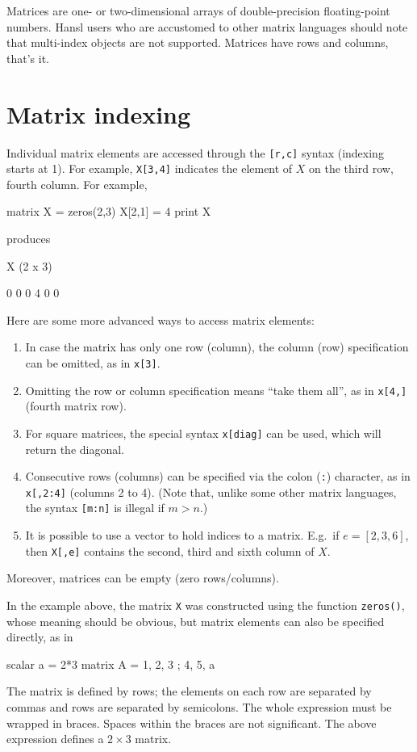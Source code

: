 Matrices are one- or two-dimensional arrays of double-precision
floating-point numbers. Hansl users who are accustomed to other matrix
languages should note that multi-index objects are not
supported. Matrices have rows and columns, that's it.

\section{Matrix indexing}
\label{sec:mat-index}

Individual matrix elements are accessed through the \verb|[r,c]|
syntax (indexing starts at 1). For example, \texttt{X[3,4]} indicates
the element of $X$ on the third row, fourth column. For example,
\begin{code}
  matrix X = zeros(2,3)
  X[2,1] = 4
  print X
\end{code}
produces
\begin{code}
X (2 x 3)

  0   0   0 
  4   0   0 
\end{code}

Here are some more advanced ways to access matrix elements:
\begin{enumerate}
\item In case the matrix has only one row (column), the column (row)
  specification can be omitted, as in \texttt{x[3]}.
\item Omitting the row or column specification means ``take them
  all'', as in \texttt{x[4,]} (fourth matrix row).
\item For square matrices, the special syntax \texttt{x[diag]} can be
  used, which will return the diagonal.
\item Consecutive rows (columns) can be specified via the colon
  (\texttt{:}) character, as in \texttt{x[,2:4]} (columns 2 to 4).
  (Note that, unlike some other matrix languages, the syntax
  \texttt{[m:n]} is illegal if $m>n$.)
\item It is possible to use a vector to hold indices to a matrix. E.g.\
  if $e = [2,3,6]$, then \texttt{X[,e]} contains the second, third and
  sixth column of $X$.
\end{enumerate}
Moreover, matrices can be empty (zero rows/columns). 

In the example above, the matrix \texttt{X} was constructed using
the function \texttt{zeros()}, whose meaning should be obvious, but
matrix elements can also be specified directly, as in
\begin{code}
scalar a = 2*3
matrix A = { 1, 2, 3 ; 4, 5, a }
\end{code}
The matrix is defined by rows; the elements on each row are separated
by commas and rows are separated by semicolons.  The whole expression
must be wrapped in braces.  Spaces within the braces are not
significant. The above expression defines a $2\times3$ matrix.

